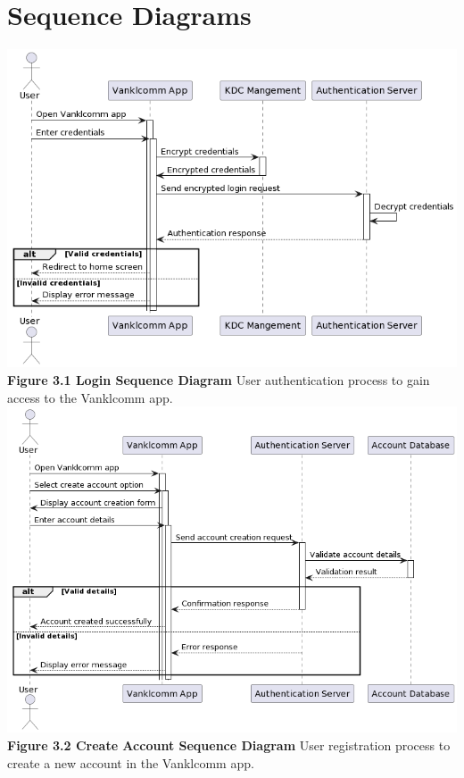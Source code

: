 \documentclass[]{article}
\begin{document}
\section{Sequence Diagrams}
\label{sec:sequence_diagrams}
\begin{center}
	\includegraphics[width=\textwidth]{../images/SequenceDiagram/Login.png}
	\textbf{Figure 3.1 Login Sequence Diagram}
	\newline User authentication process to gain access to the Vanklcomm app.
	\includegraphics[width=\textwidth]{../images/SequenceDiagram/Create_account.png}
	\textbf{Figure 3.2 Create Account Sequence Diagram}
	\newline User registration process to create a new account in the Vanklcomm app.

\end{center}
\end{document}
